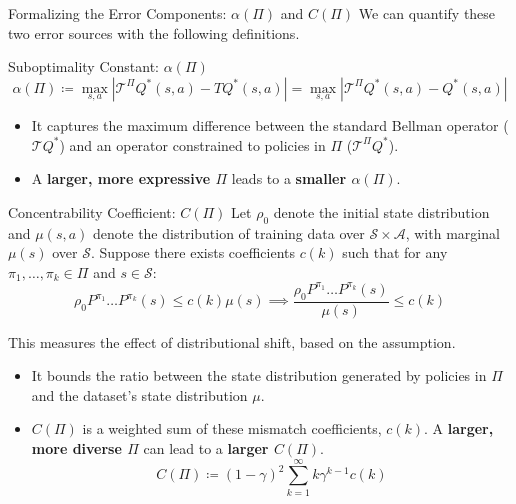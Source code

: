 \documentclass[11pt]{beamer}
\newcommand{\mc}[1]{\mathcal{#1}}
\newcommand{\tb}[1]{\textbf{#1}}
\begin{document}
\begin{frame}{Formalizing the Error Components: $\alpha(\Pi)$ and $C(\Pi)$}
    We can quantify these two error sources with the following definitions.

    \begin{block}{Suboptimality Constant: $\alpha(\Pi)$}
        \[ \alpha(\Pi) \coloneqq \max_{s,a} |\mc{T}^\Pi Q^*(s,a) - TQ^*(s,a)| = \max_{s,a} |\mc{T}^\Pi Q^*(s,a) - Q^*(s,a)| \]
        \begin{itemize}
            \item It captures the maximum difference between the standard Bellman operator ($\mc{T}Q^*$) and an operator constrained to policies in $\Pi$ ($\mc{T}^\Pi Q^*$).
            \item A \tb{larger, more expressive $\Pi$} leads to a \tb{smaller $\alpha(\Pi)$}.
        \end{itemize}
    \end{block}

    \begin{block}{Concentrability Coefficient: $C(\Pi)$}
        Let $\rho_0$ denote the initial state distribution and $\mu(s,a)$ denote the distribution of training data over $\mc{S}\times \mc{A}$, with marginal $\mu(s)$ over $\mc{S}$.
        Suppose there exists coefficients $c(k)$ such that for any $\pi_1, \dots, \pi_k \in \Pi$ and $s \in \mc{S}$:
        \[ \rho_0 P^{\pi_1} \dots P^{\pi_k}(s) \le c(k) \mu(s) \implies \frac{\rho_0 P^{\pi_1}\dots P^{\pi_k}(s)}{\mu(s)} \leq c(k)\]

        This measures the effect of distributional shift, based on the assumption.
        \begin{itemize}
            \item It bounds the ratio between the state distribution generated by policies in $\Pi$ and the dataset's state distribution $\mu$.
            \item $C(\Pi)$ is a weighted sum of these mismatch coefficients, $c(k)$. A \tb{larger, more diverse $\Pi$} can lead to a \tb{larger $C(\Pi)$}.
            \[
                C(\Pi) \coloneqq (1-\gamma)^2 \sum_{k=1}^\infty k \gamma^{k-1} c(k)
            \]
        \end{itemize}
    \end{block}
\end{frame}
\end{document}
